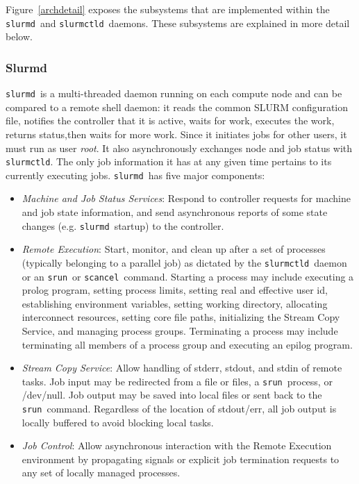 \documentclass{article}
\newcommand{\srun}{{\tt srun}}
\newcommand{\scancel}{{\tt scancel}}
\newcommand{\slurmctld}{{\tt slurmctld}}
\newcommand{\slurmd}{{\tt slurmd}}
\begin{document}
Figure~\ref{archdetail} exposes the subsystems that are implemented
within the \slurmd\ and \slurmctld\ daemons.  These subsystems
are explained in more detail below.

\subsubsection{Slurmd}

\slurmd\ is a multi-threaded daemon running on each compute node and 
can be compared to a remote shell daemon:  
it reads the common SLURM configuration file, 
notifies the controller that it is active, waits for work, 
executes the work, returns status,then waits for more work.  
Since it initiates jobs for other users, it must run as user {\em root}.
It also asynchronously exchanges node and job status with {\tt slurmctld}.  
The only job information it has at any given time pertains to its 
currently executing jobs.
\slurmd\ has five major components:

\begin{itemize}
\item {\em Machine and Job Status Services}:  Respond to controller 
requests for machine and job state information, and send asynchronous 
reports of some state changes (e.g. \slurmd\ startup) to the controller.

\item {\em Remote Execution}: Start, monitor, and clean up after a set
of processes (typically belonging to a parallel job) as dictated by the
\slurmctld\ daemon or an \srun\ or \scancel\ command. Starting a process may
include executing a prolog program, setting process limits, setting real
and effective user id, establishing environment variables, setting working
directory, allocating interconnect resources, setting core file paths,
initializing the Stream Copy Service, and managing
process groups. Terminating a process may include terminating all members
of a process group and executing an epilog program.

\item {\em Stream Copy Service}: Allow handling of stderr, stdout, and
stdin of remote tasks. Job input may be redirected from a file or files, a
\srun\ process, or /dev/null.  Job output may be saved into local files or
sent back to the \srun\ command. Regardless of the location of stdout/err,
all job output is locally buffered to avoid blocking local tasks.

\item {\em Job Control}: Allow asynchronous interaction with the
Remote Execution environment by propagating signals or explicit job
termination requests to any set of locally managed processes.

\end{itemize}
\end{document}
